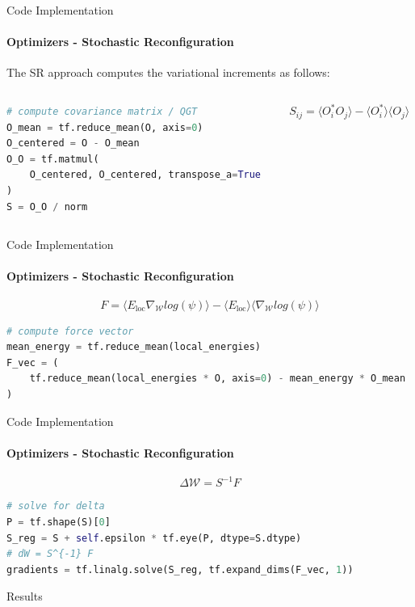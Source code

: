\documentclass{beamer}
\begin{document}
\begin{frame}[fragile]{Code Implementation}
\framesubtitle{Optimizers - Stochastic Reconfiguration}
The SR approach computes the variational increments as follows:
\begin{columns}
\begin{column}{0.6\textwidth}
\begin{lstlisting}[language=Python, style=kaolstplain]
# compute covariance matrix / QGT
O_mean = tf.reduce_mean(O, axis=0)
O_centered = O - O_mean
O_O = tf.matmul(
	O_centered, O_centered, transpose_a=True
)
S = O_O / norm
\end{lstlisting}
\end{column}
\begin{column}{0.38\textwidth}
$$S_{ij} = \langle O_i^{*} O_j \rangle - \langle O_i^{*} \rangle \langle O_j \rangle$$
\end{column}
\end{columns}
\end{frame}

\begin{frame}[fragile]{Code Implementation}
\framesubtitle{Optimizers - Stochastic Reconfiguration}
$$F = \langle E_{\text{loc}} \nabla_{\mathcal{W}} log(\psi) \rangle - \langle E_{\text{loc}} \rangle \langle \nabla_{\mathcal{W}} log(\psi) \rangle$$

\begin{lstlisting}[language=Python, style=kaolstplain]
# compute force vector
mean_energy = tf.reduce_mean(local_energies)
F_vec = (
	tf.reduce_mean(local_energies * O, axis=0) - mean_energy * O_mean
)
\end{lstlisting}
\end{frame}

\begin{frame}[fragile]{Code Implementation}
\framesubtitle{Optimizers - Stochastic Reconfiguration}
$$\Delta \mathcal{W} = S^{-1} F$$

\begin{lstlisting}[language=Python, style=kaolstplain]
# solve for delta
P = tf.shape(S)[0]
S_reg = S + self.epsilon * tf.eye(P, dtype=S.dtype)
# dW = S^{-1} F
gradients = tf.linalg.solve(S_reg, tf.expand_dims(F_vec, 1))
\end{lstlisting}
\end{frame}

\begin{chapter}{}{Results}
\end{chapter}
\end{document}
